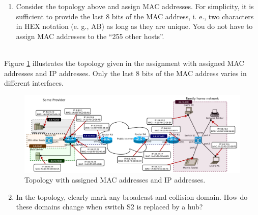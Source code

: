 
\begin{enumerate}
    \item
        Consider the topology above and assign MAC addresses. For simplicity, it is 
        sufficient to provide the last 8 bits of the MAC address, i. e., two 
        characters in HEX notation (e. g., AB) as long as they are unique. You 
        do not have to assign MAC addresses to the “255 other hosts”.
\end{enumerate}
\begin{tcolorbox}
    \mysolution{} \\
    Figure \ref{fig:fig1} illustrates the topology given in the assignment
    with assigned MAC addresses and IP addresses. Only the last 8 bits of 
    the MAC address varies in different interfaces. 
\end{tcolorbox}

\begin{figure}[H]
    \begin{center}
        \includegraphics[scale=0.5]{HW08-Q01.pdf}
        \caption{Topology with assigned MAC addresses and IP addresses.}
        \label{fig:fig1}
    \end{center}
\end{figure}

\begin{enumerate}
    \setcounter{enumi}{1}
    \item
    In the topology, clearly mark any broadcast and collision domain. How do these
    domains change when switch S2 is replaced by a hub?
\end{enumerate}

